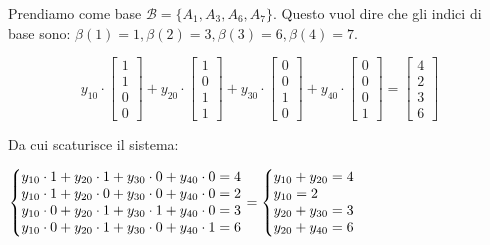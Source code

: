 \documentclass[11pt]{book}
\makeatletter
\newenvironment{sistema}%
{\left\lbrace\begin{array}{@{}l@{}}}%
{\end{array}\right.}
\makeatother
\begin{document}
Prendiamo come base $\mathcal{B} = \{ A_1, A_3, A_6, A_7\}$. Questo
vuol dire che gli indici di base sono: $\beta(1) = 1, \beta(2) = 3,
\beta(3) = 6, \beta(4) = 7$. 

\begin{center}
\[
y_{10} \cdot
\begin{bmatrix}
1 \\ 1 \\ 0 \\ 0
\end{bmatrix}
+ y_{20} \cdot
\begin{bmatrix}
1 \\ 0 \\ 1 \\ 1
\end{bmatrix}
+ y_{30} \cdot
\begin{bmatrix}
0 \\ 0 \\ 1 \\ 0
\end{bmatrix}
+ y_{40} \cdot
\begin{bmatrix}
0 \\ 0 \\ 0 \\ 1
\end{bmatrix}
= 
\begin{bmatrix}
4 \\ 2 \\ 3 \\ 6
\end{bmatrix}
\]  
\end{center}

Da cui scaturisce il sistema:

\begin{center}
$\begin{sistema}
y_{10}\cdot 1 + y_{20}\cdot 1 + y_{30}\cdot 0 + y_{40}\cdot 0  = 4 \\
y_{10}\cdot 1 + y_{20}\cdot 0 + y_{30}\cdot 0 + y_{40}\cdot 0  = 2 \\
y_{10}\cdot 0 + y_{20}\cdot 1 + y_{30}\cdot 1 + y_{40}\cdot 0  = 3 \\
y_{10}\cdot 0 + y_{20}\cdot 1 + y_{30}\cdot 0 + y_{40}\cdot 1  = 6 \\
\end{sistema}
=
\begin{sistema}
y_{10} + y_{20} = 4 \\
y_{10} = 2 \\
y_{20} + y_{30}  = 3 \\
y_{20} + y_{40} = 6 \\
\end{sistema}
$
\end{center}
\end{document}
